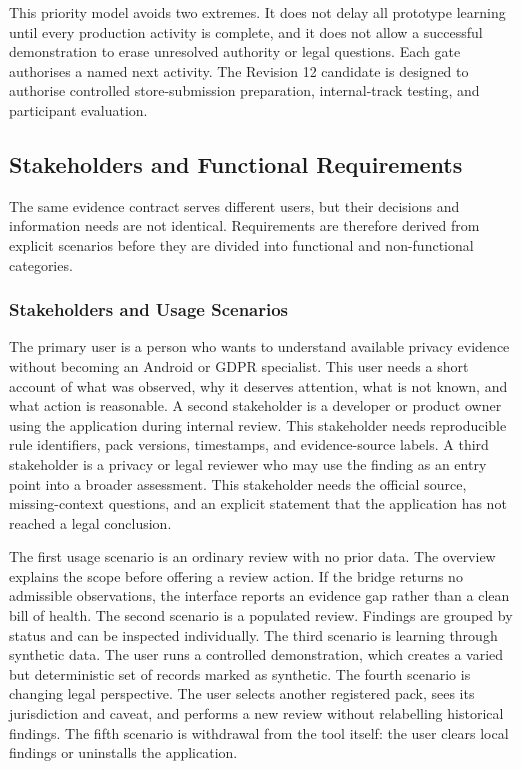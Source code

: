 This priority model avoids two extremes. It does not delay all prototype learning until every production activity is complete, and it does not allow a successful demonstration to erase unresolved authority or legal questions. Each gate authorises a named next activity. The Revision 12 candidate is designed to authorise controlled store-submission preparation, internal-track testing, and participant evaluation.

\subsection{Stakeholders and Functional Requirements}

The same evidence contract serves different users, but their decisions and information needs are not identical. Requirements are therefore derived from explicit scenarios before they are divided into functional and non-functional categories.

\subsubsection{Stakeholders and Usage Scenarios}

The primary user is a person who wants to understand available privacy evidence without becoming an Android or GDPR specialist. This user needs a short account of what was observed, why it deserves attention, what is not known, and what action is reasonable. A second stakeholder is a developer or product owner using the application during internal review. This stakeholder needs reproducible rule identifiers, pack versions, timestamps, and evidence-source labels. A third stakeholder is a privacy or legal reviewer who may use the finding as an entry point into a broader assessment. This stakeholder needs the official source, missing-context questions, and an explicit statement that the application has not reached a legal conclusion.

The first usage scenario is an ordinary review with no prior data. The overview explains the scope before offering a review action. If the bridge returns no admissible observations, the interface reports an evidence gap rather than a clean bill of health. The second scenario is a populated review. Findings are grouped by status and can be inspected individually. The third scenario is learning through synthetic data. The user runs a controlled demonstration, which creates a varied but deterministic set of records marked as synthetic. The fourth scenario is changing legal perspective. The user selects another registered pack, sees its jurisdiction and caveat, and performs a new review without relabelling historical findings. The fifth scenario is withdrawal from the tool itself: the user clears local findings or uninstalls the application.

